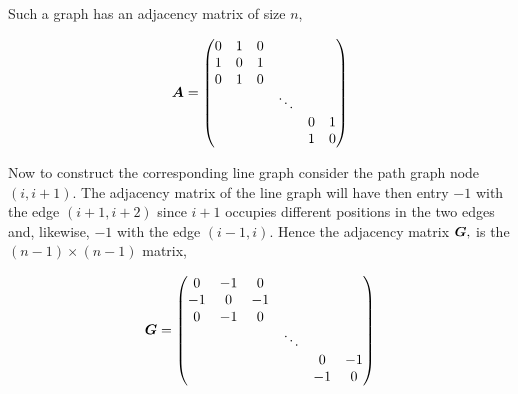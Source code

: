\begin{figure}[H]
  \centering
  
\end{figure}

Such a graph has an adjacency matrix of size $n$,

\begin{equation}
  \bm{A} =
  \begin{pmatrix}
    {0} & {1} & {0} & {}       & {}  & {}  \\
    {1} & {0} & {1} & {}       & {}  & {}  \\
    {0} & {1} & {0} & {}       & {}  & {}  \\
    {}  & {}  & {}  & {\ddots} & {}  & {}  \\
    {}  & {}  & {}  & {}       & {0} & {1} \\
    {}  & {}  & {}  & {}       & {1} & {0}
  \end{pmatrix}
\end{equation}

Now to construct the corresponding line graph consider the path graph node $(i, i+1)$. The adjacency matrix of the line graph will have then entry $-1$ with the edge $(i+1, i+2)$ since $i+1$ occupies different positions in the two edges and, likewise, $-1$ with the edge $(i-1, i)$. Hence the adjacency matrix $\bm{G},$ is the $(n-1) \times (n-1)$ matrix,

\begin{equation}
  \bm{G} =
  \begin{pmatrix}
    {0}  & {-1} & {0}  & {}       & {}   & {}   \\
    {-1} & {0}  & {-1} & {}       & {}   & {}   \\
    {0}  & {-1} & {0}  & {}       & {}   & {}   \\
    {}   & {}   & {}   & {\ddots} & {}   & {}   \\
    {}   & {}   & {}   & {}       & {0}  & {-1} \\
    {}   & {}   & {}   & {}       & {-1} & {0}
  \end{pmatrix}
\end{equation}

\begin{figure}[H]
  \centering
  
\end{figure}